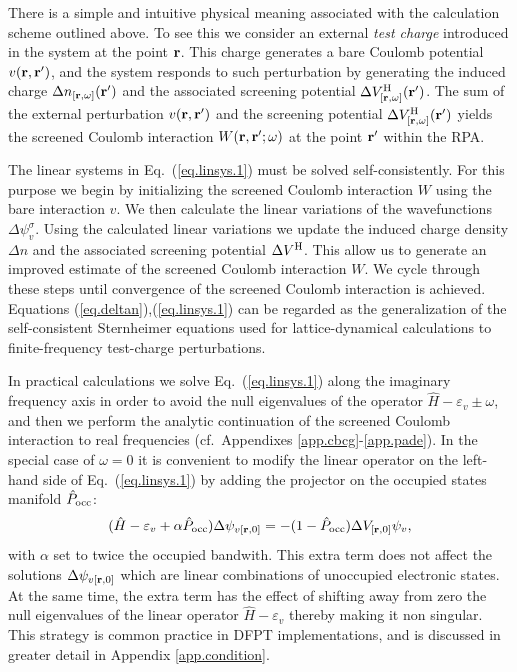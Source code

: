 \documentclass[twocolumn,prb,showpacs,superscriptaddress]{revtex4}
\def\w{\omega}
\def\H{\hat{H}}
\def\P{\hat{P}_{\rm occ}}
\def\E{\varepsilon}
\def\r{{\bf r}}
\def\rp{{\bf r^\prime}}
\begin{document}
There is a simple and intuitive physical meaning associated with 
the calculation scheme outlined above. To see this
we consider an external {\it test charge} introduced in the system
at the point $\r$. This charge generates a bare Coulomb potential $v(\r,\rp)$,
and the system responds to such perturbation by generating the induced charge
$\Delta n_{[\r,\w]}(\rp)$ and the associated 
screening potential $\Delta V^{\rm H}_{[\r,\w]}(\rp)$.
The sum of the external perturbation $v(\r,\rp)$ and the screening
potential $\Delta V^{\rm H}_{[\r,\w]}(\rp)$ yields the screened Coulomb
interaction $W(\r,\rp;\w)$ at the point $\rp$ within the RPA.

The linear systems in Eq.\ (\ref{eq.linsys.1}) must be solved self-consistently.
For this purpose we begin by initializing the screened Coulomb
interaction $W$ using the bare interaction $v$. 
We then calculate the linear variations of the wavefunctions $\Delta \psi_v^\sigma$.
Using the calculated linear variations we update the induced charge density $\Delta n$
and the associated screening potential $\Delta V^{\rm H}$. This allow us to
generate an improved estimate of the screened Coulomb interaction $W$.
We cycle through these steps until convergence of the screened Coulomb
interaction is achieved.
Equations (\ref{eq.deltan}),(\ref{eq.linsys.1}) can be regarded as
the generalization of the self-consistent Sternheimer equations used for lattice-dynamical 
calculations\cite{baroni.rmp} to finite-frequency test-charge perturbations.

In practical calculations we solve Eq.\ (\ref{eq.linsys.1}) along the imaginary
frequency axis in order to avoid the null eigenvalues of the operator
$\H-\E_v\pm\w$, and then we perform the analytic continuation of 
the screened Coulomb interaction to real frequencies (cf.\ Appendixes \ref{app.cbcg}-\ref{app.pade}).
In the special case of $\w=0$ it is convenient to modify the linear operator on the left-hand side of
Eq.\ (\ref{eq.linsys.1}) by adding the projector on the occupied states manifold $\P$:
 \begin{equation} \label{eq.linsys.1b}
 (\H-\E_v+\alpha\P) \Delta \psi_{v[\r,0]}  = -(1-\P)  \Delta V_{[\r,0]} \psi_v,
  \end{equation}
with $\alpha$ set to twice the occupied bandwith. This extra term does not affect
the solutions $\Delta \psi_{v[\r,0]}$ which are linear combinations
of unoccupied electronic states. At the same time, the extra term
has the effect of shifting away from zero the null eigenvalues 
of the linear operator $\H-\E_v$ thereby making it non singular.
This strategy is common practice in DFPT implementations,\cite{baroni.rmp,espresso} and
is discussed in greater detail in Appendix \ref{app.condition}.
\end{document}
